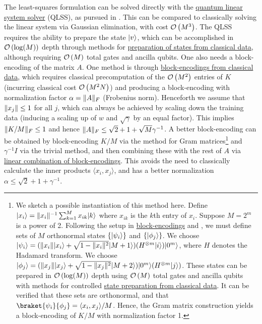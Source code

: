 \begin{refsection}
The least-squares formulation can be solved directly with the \hyperref[prim:QuantumLinearSystemSolvers]{quantum linear system solver} (QLSS), as pursued in \cite{rebentrost2014QSVM}. This can be compared to classically solving the linear system via Gaussian elimination, with cost $\mathcal{O}\left( M^3 \right)$. The QLSS requires the ability to prepare the state $\lvert v\rangle$, which can be accomplished in $\mathcal{O}\left( \log(M) \right)$ depth through methods for \hyperref[prim:StatePrepData]{preparation of states from classical data}, although requiring $\mathcal{O}\left( M \right)$ total gates and ancilla qubits. One also needs a block-encoding of the matrix $A$. One method is through \hyperref[prim:BlockEncodingsClassical]{block-encodings from classical data}, which requires classical precomputation of the $\mathcal{O}\left( M^2 \right)$ entries of $K$ (incurring classical cost $\mathcal{O}\left( M^2N \right)$) and producing a block-encoding with normalization factor $\alpha = \lVert A\rVert_F$ (Frobenius norm). Henceforth we assume that $\lVert x_j\rVert \leq 1$ for all $j$, which can always be achieved by scaling down the training data (inducing a scaling up of $w$ and $\sqrt{\gamma}$ by an equal factor). This implies $\lVert K/M\rVert_F \leq 1$ and hence $\lVert A\rVert_F \leq \sqrt{2}+1+\sqrt{M}\gamma^{-1}$. A better block-encoding can be obtained by block-encoding $K/M$ via the method for Gram matrices\footnote{We sketch a possible instantiation of this method here. Define $\lvert x_i\rangle = \lVert x_i\rVert^{-1} \sum_{k=1}^M x_{ik}\lvert k\rangle$ where $x_{ik}$ is the $k$th entry of $x_i$. Suppose $M=2^m$ is a power of 2. Following the setup in \hyperref[prim:BlockEncodings]{block-encodings} and \cite[Lemma 47]{gilyen2018QSingValTransf}, we must define sets of $M$ orthonormal states $\{\lvert\psi_i\rangle\}$ and $\{\lvert\phi_j\rangle\}$. We choose $\lvert\psi_i\rangle = (\lVert x_i\rVert\lvert x_i\rangle + \sqrt{1-\lVert x_i\rVert^2}\lvert M+1\rangle)(H^{\otimes m} \lvert i\rangle)\lvert0^m\rangle$, where $H$ denotes the Hadamard transform.  We choose $\lvert\phi_j\rangle = (\lVert x_j\rVert\lvert x_j\rangle + \sqrt{1-\lVert x_j\rVert^2}\lvert M+2\rangle)\lvert0^m\rangle(H^{\otimes m}\lvert j\rangle)$. These states can be prepared in $\mathcal{O}\left( \log(M) \right)$ depth using $\mathcal{O}\left( M \right)$ total gates and ancilla qubits with methods for controlled \hyperref[prim:StatePrepData]{state preparation from classical data}. It can be verified that these sets are orthonormal, and that $\braket{\psi_i}{\phi_j} = \langle x_i, x_j \rangle/M$. Hence, the Gram matrix construction yields a block-encoding of $K/M$ with normalization factor 1.} and $\gamma^{-1}I$ via the trivial method, and then combining these with the rest of $A$ via \hyperref[prim:LCU]{linear combination of block-encodings}. This avoids the need to classically calculate the inner products $\langle x_i, x_j \rangle$, and has a better normalization $\alpha \leq \sqrt{2} + 1+\gamma^{-1}$.


\end{refsection}
